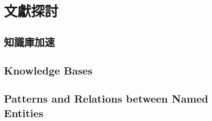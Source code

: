 \chapter{文獻探討}
\label{c:related}

%
%
\section{知識庫加速}


%
%
\section{Knowledge Bases}


%
%
\section{Patterns and Relations between Named Entities}



%
%


